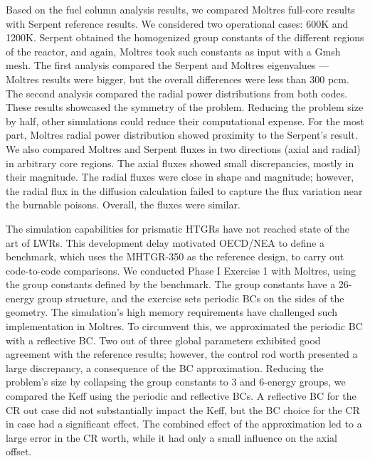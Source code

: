 Based on the fuel column analysis results, we compared Moltres full-core results with Serpent reference results.
We considered two operational cases: 600K and 1200K.
Serpent obtained the homogenized group constants of the different regions of the reactor, and again, Moltres took such constants as input with a Gmsh mesh.
The first analysis compared the Serpent and Moltres eigenvalues --- Moltres results were bigger, but the overall differences were less than 300 pcm.
The second analysis compared the radial power distributions from both codes.
These results showcased the symmetry of the problem.
Reducing the problem size by half, other simulations could reduce their computational expense.
For the most part, Moltres radial power distribution showed proximity to the Serpent's result.
We also compared Moltres and Serpent fluxes in two directions (axial and radial) in arbitrary core regions.
The axial fluxes showed small discrepancies, mostly in their magnitude.
The radial fluxes were close in shape and magnitude; however, the radial flux in the diffusion calculation failed to capture the flux variation near the burnable poisons.
Overall, the fluxes were similar.

The simulation capabilities for prismatic HTGRs have not reached state of the art of LWRs.
This development delay motivated OECD/NEA to define a benchmark, which uses the MHTGR-350 as the reference design, to carry out code-to-code comparisons.
We conducted Phase I Exercise 1 with Moltres, using the group constants defined by the benchmark.
The group constants have a 26-energy group structure, and the exercise sets periodic \glspl{BC} on the sides of the geometry.
The simulation's high memory requirements have challenged such implementation in Moltres.
To circumvent this, we approximated the periodic \gls{BC} with a reflective BC.
Two out of three global parameters exhibited good agreement with the reference results; however, the control rod worth presented a large discrepancy, a consequence of the BC approximation.
Reducing the problem's size by collapsing the group constants to 3 and 6-energy groups, we compared the \gls{Keff} using the periodic and reflective BCs.
A reflective BC for the \gls{CR} out case did not substantially impact the \gls{Keff}, but the BC choice for the CR in case had a significant effect.
The combined effect of the approximation led to a large error in the CR worth, while it had only a small influence on the axial offset.